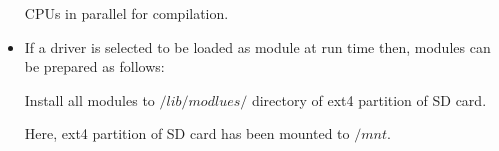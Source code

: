 \begin{itemize}
		CPUs in parallel for compilation.\par
		 \par
	\item If a driver is selected to be loaded as module at run time
		then, modules can be prepared as follows:\par
		 \par
		Install all modules to $/lib/modlues/$ directory of ext4
		partition of SD card.\par
		 \par
		Here, ext4 partition of SD card has been mounted to $/mnt$.
\end{itemize}
